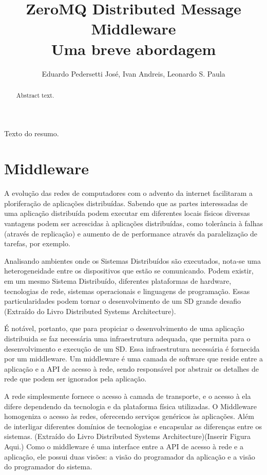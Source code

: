 \documentclass[12pt]{article}
\title{ZeroMQ Distributed Message Middleware\\Uma breve abordagem}
\author{Eduardo Pedersetti José\inst{1}, Ivan Andreis\inst{1}, Leonardo S. Paula\inst{1}}
\begin{document}
 

\maketitle

\begin{abstract}
  Abstract text.
\end{abstract}
     
\begin{resumo} 
  Texto do resumo.
\end{resumo}

\section{Middleware}
A evolução das redes de computadores com o advento da internet facilitaram a ploriferação 
de aplicações distribuídas. Sabendo que as partes interessadas de uma aplicação
distribuída podem executar em diferentes locais físicos diversas vantagens podem ser
acrescidas à aplicações distribuídas, como tolerância à falhas (através de replicação) e
aumento de de performance através da paralelização de tarefas, por exemplo.

Analisando ambientes onde os Sistemas Distribuídos são executados, nota-se uma
heterogeneidade entre os dispositivos que estão se comunicando. Podem existir, em um 
mesmo Sistema Distribuído, diferentes plataformas de hardware, tecnologias de rede,
sistemas operacionais e linguagens de programação. Essas particularidades podem tornar o
desenvolvimento de um SD grande desafio  (Extraído do Livro Distributed Systems
Architecture).

É notável, portanto, que para propiciar o desenvolvimento de uma aplicação distribuida se
faz necessária uma infraestrutura adequada, que permita para o desenvolvimento e execução
de um SD. Essa infraestrutura necessária é fornecida por um middleware. Um middleware é
uma camada de software que reside entre a aplicação e a API de acesso à rede, sendo
responsável por abstrair os detalhes de rede que podem ser ignorados pela aplicação.

A rede simplesmente fornece o acesso à camada de transporte, e o acesso à ela difere
dependendo da tecnologia e da plataforma física utilizadas. O Middleware homogeniza o
acesso às redes, oferecendo serviços genéricos às aplicações. Além de interligar
diferentes domínios de tecnologias e encapsular as diferenças entre os sistemas. (Extraído
do Livro Distributed Systems Architecture)(Inserir Figura Aqui.)
Como o middleware é uma interface entre a API de acesso à rede e a aplicação, ele possui
duas visões: a visão do programador da aplicação e a visão do programador do sistema.
\end{document}
